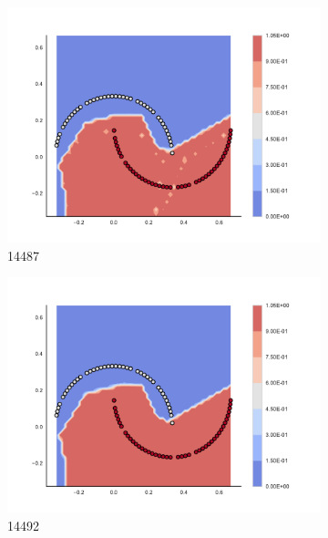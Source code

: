 \begin{figure}[h]
\begin{subfigure}[b]{0.09\textwidth}
    \includegraphics[clip, trim=2.35cm 1.75cm 4.5cm 0cm,width=\textwidth]{img/convergence/14487.pdf}
    \caption{14487}
    \label{fig:convergence_14487}
\end{subfigure}
%
\begin{subfigure}[b]{0.09\textwidth}
    \includegraphics[clip, trim=2.35cm 1.75cm 4.5cm 0cm,width=\textwidth]{img/convergence/14492.pdf}
    \caption{14492}
    \label{fig:convergence_14492}
\end{subfigure}
%
\begin{subfigure}[b]{0.09\textwidth}

\end{subfigure}
\end{figure}

